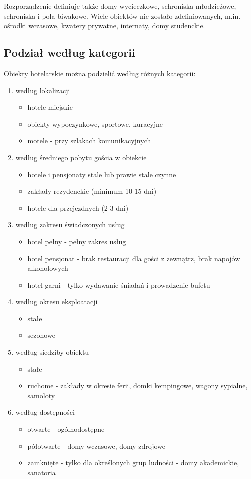 \documentclass[a4paper,onecolumn,oneside,11pt,wide,floatssmall]{mwrep}
\theoremstyle{definition}
\theoremstyle{plain}%
\theoremstyle{remark}
\begin{document}
Rozporządzenie definiuje także domy wycieczkowe, schroniska młodzieżowe, 
schroniska i pola biwakowe. Wiele obiektów nie zostało zdefiniowanych, m.in. 
ośrodki wczasowe, kwatery prywatne, internaty, domy studenckie.


\subsection{Podział według kategorii} 
Obiekty hotelarskie można podzielić według różnych kategorii\cite[15-16]{
KlasKatZakHot}:

\begin{enumerate}
  \item według lokalizacji
    \begin{itemize}
      \item hotele miejskie
      \item obiekty wypoczynkowe, sportowe, kuracyjne
      \item motele - przy szlakach komunikacyjnych
    \end{itemize}
  \item według średniego pobytu gościa w obiekcie
    \begin{itemize}
      \item hotele i pensjonaty stale lub prawie stale czynne
      \item zakłady rezydenckie (minimum 10-15 dni)
      \item hotele dla przejezdnych (2-3 dni)
    \end{itemize}
  \item według zakresu świadczonych usług
    \begin{itemize}
      \item hotel pełny - pełny zakres usług
      \item hotel pensjonat - brak restauracji dla gości z zewnątrz, brak 
      napojów alkoholowych
      \item hotel garni - tylko wydawanie śniadań i prowadzenie bufetu
    \end{itemize}
  \item według okresu eksploatacji
    \begin{itemize}
      \item stałe
      \item sezonowe
    \end{itemize}
  \item według siedziby obiektu
    \begin{itemize}
      \item stałe
      \item ruchome - zakłady w okresie ferii, domki kempingowe, wagony 
      sypialne, samoloty
    \end{itemize}
  \item według dostępności
    \begin{itemize}
      \item otwarte - ogólnodostępne
      \item półotwarte - domy wczasowe, domy zdrojowe
      \item zamknięte - tylko dla określonych grup ludności - domy 
      akademickie, sanatoria
    \end{itemize}
\end{enumerate}
\end{document}
